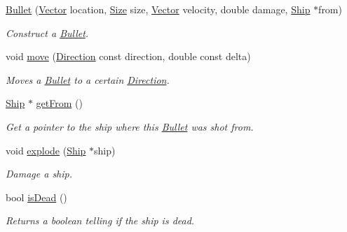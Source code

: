 \begin{DoxyCompactItemize}
\item 
\hypertarget{classty_lib_1_1_bullet_a7f35993fc9d86f929c588f1b8cb9b8dd}{}\hyperlink{classty_lib_1_1_bullet_a7f35993fc9d86f929c588f1b8cb9b8dd}{Bullet} (\hyperlink{classty_lib_1_1_vector}{Vector} location, \hyperlink{classty_lib_1_1_size}{Size} size, \hyperlink{classty_lib_1_1_vector}{Vector} velocity, double damage, \hyperlink{classty_lib_1_1_ship}{Ship} $\ast$from)\label{classty_lib_1_1_bullet_a7f35993fc9d86f929c588f1b8cb9b8dd}

\begin{DoxyCompactList}\small\item\em Construct a \hyperlink{classty_lib_1_1_bullet}{Bullet}. \end{DoxyCompactList}\item 
\hypertarget{classty_lib_1_1_bullet_a068bd7c9f65cf51ccb3f94a1bb2c80f2}{}void \hyperlink{classty_lib_1_1_bullet_a068bd7c9f65cf51ccb3f94a1bb2c80f2}{move} (\hyperlink{classty_lib_1_1_direction}{Direction} const direction, double const delta)\label{classty_lib_1_1_bullet_a068bd7c9f65cf51ccb3f94a1bb2c80f2}

\begin{DoxyCompactList}\small\item\em Moves a \hyperlink{classty_lib_1_1_bullet}{Bullet} to a certain \hyperlink{classty_lib_1_1_direction}{Direction}. \end{DoxyCompactList}\item 
\hypertarget{classty_lib_1_1_bullet_a97425f9c2b614c3a229b4142ffaedde9}{}\hyperlink{classty_lib_1_1_ship}{Ship} $\ast$ \hyperlink{classty_lib_1_1_bullet_a97425f9c2b614c3a229b4142ffaedde9}{get\+From} ()\label{classty_lib_1_1_bullet_a97425f9c2b614c3a229b4142ffaedde9}

\begin{DoxyCompactList}\small\item\em Get a pointer to the ship where this \hyperlink{classty_lib_1_1_bullet}{Bullet} was shot from. \end{DoxyCompactList}\item 
\hypertarget{classty_lib_1_1_bullet_a7042812d0654cb80700694f77f5080c3}{}void \hyperlink{classty_lib_1_1_bullet_a7042812d0654cb80700694f77f5080c3}{explode} (\hyperlink{classty_lib_1_1_ship}{Ship} $\ast$ship)\label{classty_lib_1_1_bullet_a7042812d0654cb80700694f77f5080c3}

\begin{DoxyCompactList}\small\item\em Damage a ship. \end{DoxyCompactList}\item 
\hypertarget{classty_lib_1_1_bullet_adad47e720856da037efda380c4e6cfb9}{}bool \hyperlink{classty_lib_1_1_bullet_adad47e720856da037efda380c4e6cfb9}{is\+Dead} ()\label{classty_lib_1_1_bullet_adad47e720856da037efda380c4e6cfb9}

\begin{DoxyCompactList}\small\item\em Returns a boolean telling if the ship is dead. \end{DoxyCompactList}\end{DoxyCompactItemize}

